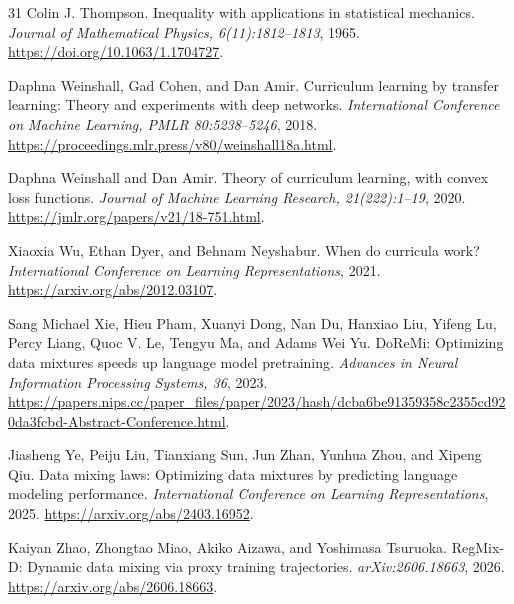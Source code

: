 \begin{thebibliography}{31}
Colin J. Thompson. Inequality with applications in statistical mechanics. \emph{Journal of Mathematical Physics, 6(11):1812--1813}, 1965. \url{https://doi.org/10.1063/1.1704727}.

Daphna Weinshall, Gad Cohen, and Dan Amir. Curriculum learning by transfer learning: Theory and experiments with deep networks. \emph{International Conference on Machine Learning, PMLR 80:5238--5246}, 2018. \url{https://proceedings.mlr.press/v80/weinshall18a.html}.

Daphna Weinshall and Dan Amir. Theory of curriculum learning, with convex loss functions. \emph{Journal of Machine Learning Research, 21(222):1--19}, 2020. \url{https://jmlr.org/papers/v21/18-751.html}.

Xiaoxia Wu, Ethan Dyer, and Behnam Neyshabur. When do curricula work? \emph{International Conference on Learning Representations}, 2021. \url{https://arxiv.org/abs/2012.03107}.

Sang Michael Xie, Hieu Pham, Xuanyi Dong, Nan Du, Hanxiao Liu, Yifeng Lu, Percy Liang, Quoc V. Le, Tengyu Ma, and Adams Wei Yu. DoReMi: Optimizing data mixtures speeds up language model pretraining. \emph{Advances in Neural Information Processing Systems, 36}, 2023. \url{https://papers.nips.cc/paper_files/paper/2023/hash/dcba6be91359358c2355cd920da3fcbd-Abstract-Conference.html}.

Jiasheng Ye, Peiju Liu, Tianxiang Sun, Jun Zhan, Yunhua Zhou, and Xipeng Qiu. Data mixing laws: Optimizing data mixtures by predicting language modeling performance. \emph{International Conference on Learning Representations}, 2025. \url{https://arxiv.org/abs/2403.16952}.

Kaiyan Zhao, Zhongtao Miao, Akiko Aizawa, and Yoshimasa Tsuruoka. RegMix-D: Dynamic data mixing via proxy training trajectories. \emph{arXiv:2606.18663}, 2026. \url{https://arxiv.org/abs/2606.18663}.

\end{thebibliography}
